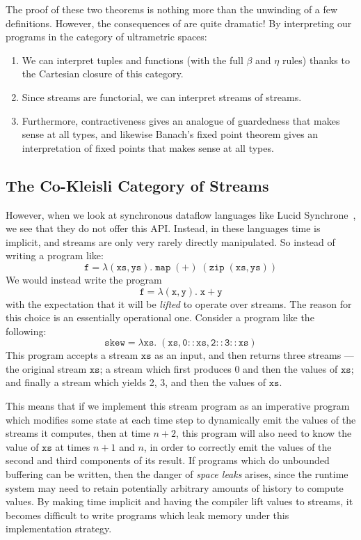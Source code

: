 \documentclass[preprint]{sigplanconf}
\newcommand{\term}[1]{\ensuremath{\mathtt{{#1}}}}
\newcommand{\fun}[2]{\lambda {#1}.\;{#2}}
\begin{document}
The proof of these two theorems is nothing more than the unwinding of
a few definitions. However, the consequences of are quite dramatic! By
interpreting our programs in the category of ultrametric spaces:
\begin{enumerate}
\item We can interpret tuples and functions (with the full $\beta$ and
  $\eta$ rules) thanks to the Cartesian closure of this category.
\item Since streams are functorial, we can interpret streams of
  streams.
\item Furthermore, contractiveness gives an analogue of guardedness
  that makes sense at all types, and likewise Banach's fixed point
  theorem gives an interpretation of fixed points that makes sense at
  all types.
\end{enumerate}

\subsection{The Co-Kleisli Category of Streams}

However, when we look at synchronous dataflow languages like Lucid
Synchrone~\cite{synchrone}, we see that they do not offer this
API. Instead, in these languages time is implicit, and streams are
only very rarely directly manipulated. So instead of writing a program
like:
\begin{displaymath}
  \term{f = \fun{(xs,ys)}{map\;(+)\;(zip\;(xs,ys))}}
\end{displaymath}
We would instead write the program
\begin{displaymath}
  \term{f = \fun{(x,y)}{x + y}}
\end{displaymath}
with the expectation that it will be \emph{lifted} to operate over
streams. The reason for this choice is an essentially operational
one. Consider a program like the following: 
%
\begin{displaymath}
  \term{skew = \fun{xs}{(xs, 0 :: xs, 2 :: 3 :: xs)}}
\end{displaymath}
% 
This program accepts a stream \term{xs} as an input, and then
returns three streams --- the original stream \term{xs}; a stream
which first produces 0 and then the values of \term{xs}; and finally a
stream which yields 2, 3, and then the values of \term{xs}.

This means that if we implement this stream program as an imperative
program which modifies some state at each time step to dynamically
emit the values of the streams it computes, then at time $n+2$, this
program will also need to know the value of \term{xs} at times $n+1$
and $n$, in order to correctly emit the values of the second and third
components of its result. If programs which do unbounded buffering can
be written, then the danger of \emph{space leaks} arises, since the
runtime system may need to retain potentially arbitrary amounts of
history to compute values. By making time implicit and having the
compiler lift values to streams, it becomes difficult to write
programs which leak memory under this implementation strategy.
\end{document}
